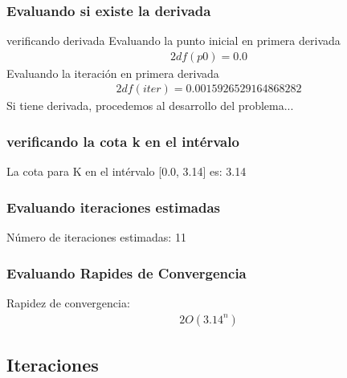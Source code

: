 \documentclass{article}%
\begin{document}
%
\subsubsection{Evaluando si existe la derivada}%
\label{ssubsec:Evaluandosiexisteladerivada}%
verificando derivada\newline%
%
\newline%
Evaluando la punto inicial en primera derivada\newline%
%
\begin{alignat*}{2}%
df(p0) = 0.0%
\end{alignat*}%
\newline%
Evaluando la iteración en primera derivada\newline%
%
\begin{alignat*}{2}%
df(iter) = 0.0015926529164868282%
\end{alignat*}%
Si tiene derivada, procedemos al desarrollo del problema...

%
\subsubsection{verificando la cota k en el intérvalo}%
\label{ssubsec:verificandolacotakenelintrvalo}%
\newline%
La cota para K en el intérvalo {[}0.0, 3.14{]} es: 3.14\newline%

%
\subsubsection{Evaluando iteraciones estimadas}%
\label{ssubsec:Evaluandoiteracionesestimadas}%
\newline%
Número de iteraciones estimadas: 11\newline%

%
\subsubsection{Evaluando Rapides de Convergencia}%
\label{ssubsec:EvaluandoRapidesdeConvergencia}%
\newline%
Rapidez de convergencia:%
\begin{alignat*}{2}%
O(3.14^n)%
\end{alignat*}

%
\subsection{Iteraciones}%
\label{subsec:Iteraciones}%
\end{document}
